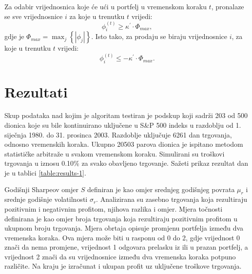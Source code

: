 \documentclass[lmodern, utf8, diplomski, numeric]{fer}
\newcommand{\q}{\left}
\newcommand{\w}{\right}
\begin{document}
  Za odabir vrijednosnica koje će ući u portfelj u vremenskom koraku $t$, pronalaze se sve vrijednosnice $i$ za koje u trenutku $t$ vrijedi:
  \begin{equation*}
  \phi_i^{\q(t\w)} \ge \kappa^\prime \cdot \Phi_\mathit{max},
  \end{equation*}
  gdje je $\Phi_\mathit{max} = \max_j \q\{ \q\lvert \phi_j \w\rvert \w\}$.
  Isto tako, za prodaju se biraju vrijednosnice $i$, za koje u trenutku $t$ vrijedi:
  \begin{equation*}
  \phi_i^{\q(t\w)} \le -\kappa^\prime \cdot \Phi_\mathit{max}.
  \end{equation*}
  
  \chapter{Rezultati}
  Skup podataka nad kojim je algoritam testiran je podskup koji sadrži 203 od 500 dionica koje su bile kontinuirano uključene u S\&P 500 indeks u razdoblju od 1. siječnja 1980. do 31. prosinca 2003.
  Razdoblje uključuje 6261 dan trgovanja, odnosno vremenskih koraka.
  Ukupno 20503 parova dionica je ispitano metodom statističke arbitraže u svakom vremenskom koraku.
  Simulirani su troškovi trgovanja u iznosu 0.10\% za svako obavljeno trgovanje.
  Sažeti prikaz rezultat dan je u tablici \ref{table:results-1}.
  
  Godišnji Sharpeov omjer $S$ definiran je kao omjer srednjeg godišnjeg povrata $\mu_r$ i srednje godišnje volatilnosti $\sigma_r$.
  Analizirana su zasebno trgovanja koja rezultiraju pozitivnim i negativnim profitom, njihova razlika i omjer.
  Mjera točnosti definirana je kao omjer broja trgovanja koja rezultiraju pozitivnim profitom u ukupnom broju trgovanja.
  Mjera obrtaja  opisuje promjenu portfelja između dva vremenska koraka.
  Ova mjera može biti u rasponu od 0 do 2, gdje vrijednost 0 znači da nema promjene, vrijednost 1 odgovara prelasku iz ili u prazan portfelj, a vrijednost 2 znači da su vrijednosnice između dva vremenska koraka potpuno različite.
  Na kraju je izračunat i ukupan profit uz uključene troškove trgovanja.
  
\end{document}
